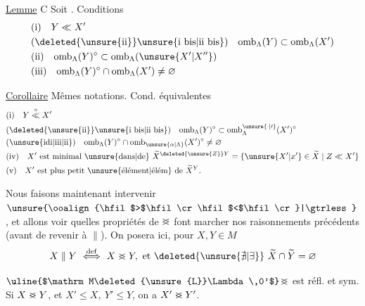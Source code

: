 \uline{Lemme} C Soit
. Conditions 
\[
 \begin{aligned}
 &\text{(i)}\quad Y\ll X'\\
 &\text{(\deleted{\unsure{ii}}\unsure{i bis|ii bis})}\quad\mathrm{omb}_{\Lambda}(Y)\subset\mathrm{omb}_{\Lambda}(X')\\
 &\text{(ii)}\quad\mathrm{omb}_{\Lambda}(Y)^{\circ}\subset\mathrm{omb}_{\Lambda}(\unsure{X'|X''})\\
 &\text{(iii)}\quad\mathrm{omb}_{\Lambda}(Y)^{\circ}\cap\mathrm{omb}_{\Lambda}(X')\ne\varnothing
 \end{aligned}
\]

\uline{Corollaire} Mêmes notations. Cond. équivalentes
\[
 \begin{aligned}
 &\text{(i)}\quad Y\mathrel{\overset{\circ}{\ll}}X'\\
 &\text{(\deleted{\unsure{ii}}\unsure{i bis|ii bis})}\quad\mathrm{omb}_{\Lambda}(Y)^{\circ}\subset\mathrm{omb}_{\Lambda}^{\unsure{\cdot|\prime}}(X')^{\circ}\\
 &\text{(\unsure{idi|iii|ii})}\quad\mathrm{omb}_{\Lambda}(Y)^{\circ}\cap\mathrm{omb}_{\unsure{\alpha|\Lambda}}(X')^{\circ}\ne\varnothing\\
 &\text{(iv)}\quad X'\text{ est minimal \unsure{dans|de} }\widetilde X^{\deleted{\unsure{Z}}Y}
   =\{\unsure{X'|x'}\in\widetilde X\mid Z\ll X'\}\\
 &\text{(v)}\quad X'\text{ est plus petit \unsure{élément|élém} de }\widetilde X^{Y}.
 \end{aligned}
\]

Nous faisons maintenant intervenir $\unsure{\ooalign{\hfil$>$\hfil\cr\hfil$<$\hfil\cr}|\gtrless}$, et allons voir quelles propriétés de $\ooalign{\hfil$>$\hfil\cr\hfil$<$\hfil\cr}$ font marcher nos raisonnements précédents (avant de  revenir à $\parallel$). On posera ici, pour $X,Y\in M$
\[
 X\parallel Y\ \overset{\mathrm{def}}{\Longleftrightarrow}\ X\mathrel{\ooalign{\hfil$>$\hfil\cr\hfil$<$\hfil\cr}}Y,\ \text{et }\deleted{\unsure{\nexists|\exists}}\ \widetilde X\cap\widetilde Y=\varnothing
\]

$\text{\uline{$\mathrm M\deleted{\unsure{L}}\Lambda\,0'$}}$\quad $\ooalign{\hfil$>$\hfil\cr\hfil$<$\hfil\cr}$ est réfl. et sym. Si $X\mathrel{\ooalign{\hfil$>$\hfil\cr\hfil$<$\hfil\cr}}Y$, et $X'\leq X,\ Y'\leq Y$, on a $X'\mathrel{\ooalign{\hfil$>$\hfil\cr\hfil$<$\hfil\cr}}Y'$.


